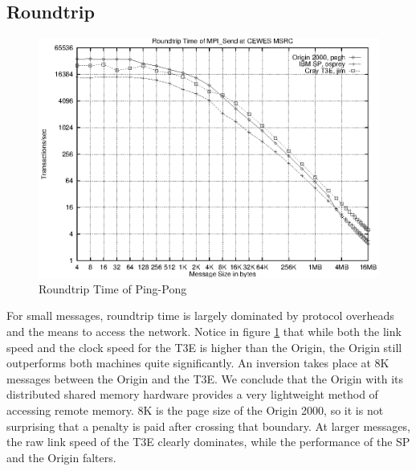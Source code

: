 \documentclass [12pt]{article}
\begin{document}
\subsection{Roundtrip}
\begin{figure}[Hht]
\centerline{\includegraphics{pics/cewes_mpi_roundtrip.ps}}
\caption{Roundtrip Time of Ping-Pong}\label{roundtrip}
\end{figure}

For small messages, roundtrip time is largely dominated by protocol
overheads and the means to access the network. Notice in figure \ref{roundtrip} that while both
the link speed and the clock speed for the T3E is higher than the Origin,
the Origin still outperforms both machines quite significantly. An inversion
takes place at 8K messages between the Origin and the T3E. We conclude that 
the Origin with its distributed shared memory hardware provides a very
lightweight method of accessing remote memory. 8K is the page size of the
Origin 2000, so it is not surprising that a penalty is paid after crossing
that boundary. At larger messages, the raw link speed of the T3E clearly
dominates, while the performance of the SP and the Origin falters.

\clearpage
\newpage
\end{document}
